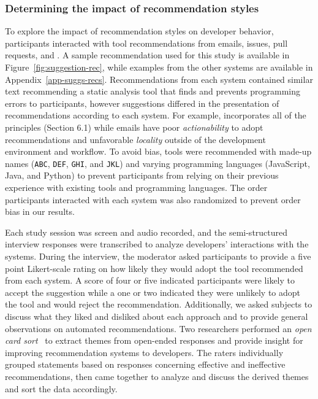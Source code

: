 \subsubsection{Determining the impact of recommendation styles}

To explore the impact of recommendation styles on developer behavior, participants interacted with tool recommendations from emails, issues, pull requests, and \sugg. A sample \suggs recommendation used for this study is available in Figure~\ref{fig:suggestion-rec}, while examples from the other systems are available in Appendix~\ref{app-suggs-recs}. Recommendations from each system contained similar text recommending a static analysis tool that finds and prevents programming errors to participants, however suggestions differed in the presentation of recommendations according to each system. For example, \suggs incorporates all of the \framework principles (Section 6.1) while emails have poor \textit{actionability} to adopt recommendations and unfavorable \textit{locality} outside of the development environment and workflow. To avoid bias, tools were recommended with made-up names (\texttt{ABC}, \texttt{DEF}, \texttt{GHI}, and \texttt{JKL}) and varying programming languages (JavaScript, Java, and Python) to prevent participants from relying on their previous experience with existing tools and programming languages. The order participants interacted with each system was also randomized to prevent order bias in our results. 

Each study session was screen and audio recorded, and the semi-structured interview responses were transcribed to analyze developers' interactions with the systems. During the interview, the moderator asked participants to provide a five point Likert-scale rating on how likely they would adopt the tool recommended from each system. A score of four or five indicated participants were likely to accept the suggestion while a one or two indicated they were unlikely to adopt the tool and would reject the recommendation. Additionally, we asked subjects to discuss what they liked and disliked about each approach and to provide general observations on automated recommendations. Two researchers performed an \textit{open card sort}~\cite{begel2014analyze} to extract themes from open-ended responses and provide insight for improving recommendation systems to developers. The raters individually grouped statements based on responses concerning effective and ineffective recommendations, then came together to analyze and discuss the derived themes and sort the data accordingly.

